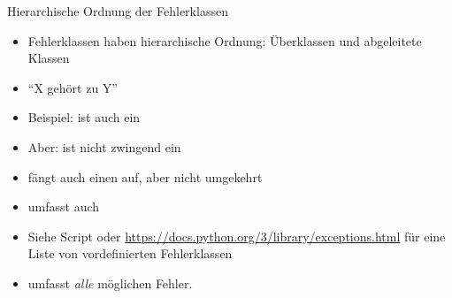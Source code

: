 
\begin{frame}[fragile]{Hierarchische Ordnung der Fehlerklassen}
%
\begin{itemize}
\item Fehlerklassen haben hierarchische Ordnung: Überklassen und abgeleitete Klassen
\item \enquote{X gehört zu Y}
\item Beispiel:  ist auch ein 
\item Aber:  ist nicht zwingend ein 
\item[\Thus]  fängt auch einen  auf, aber nicht umgekehrt
\item {} umfasst \zB auch 
\item Siehe Script oder \url{https://docs.python.org/3/library/exceptions.html} für eine Liste von vordefinierten Fehlerklassen
\item {} umfasst \emph{alle} möglichen Fehler.
\end{itemize}
%
\end{frame}


